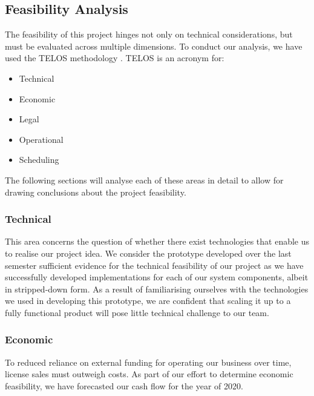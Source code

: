 \documentclass[main.tex]{subfiles}
\begin{document}
\subsection{Feasibility Analysis}
\label{Feasibility Analysis}

The feasibility of this project hinges not only on technical considerations, but must be evaluated across multiple dimensions. To conduct our analysis, we have used the TELOS methodology \cite{drljaca_latinovic_2018}. TELOS is an acronym for:

\begin{itemize}
    \item Technical
    \item Economic
    \item Legal
    \item Operational
    \item Scheduling
\end{itemize}

The following sections will analyse each of these areas in detail to allow for drawing conclusions about the project feasibility.

\subsubsection{Technical}

This area concerns the question of whether there exist technologies that enable us to realise our project idea. We consider the prototype developed over the last semester sufficient evidence for the technical feasibility of our project as we have successfully developed implementations for each of our system components, albeit in stripped-down form. As a result of familiarising ourselves with the technologies we used in developing this prototype, we are confident that scaling it up to a fully functional product will pose little technical challenge to our team.

\subsubsection{Economic}

To reduced reliance on external funding for operating our business over time, license sales must outweigh costs. As part of our effort to determine economic feasibility, we have forecasted our cash flow for the year of 2020.
\end{document}
